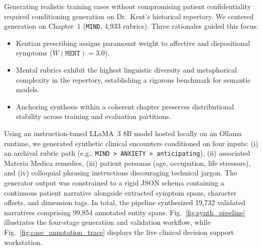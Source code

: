 Generating realistic training cases without compromising patient confidentiality required conditioning generation on Dr.~Kent's historical repertory. We centered generation on Chapter~1 (\texttt{MIND}, 4,933 rubrics). Three rationales guided this focus:
\begin{itemize}
    \item Kentian prescribing assigns paramount weight to affective and dispositional symptoms ($W(\texttt{MENT}) = 3.0$).
    \item Mental rubrics exhibit the highest linguistic diversity and metaphorical complexity in the repertory, establishing a rigorous benchmark for semantic models.
    \item Anchoring synthesis within a coherent chapter preserves distributional stability across training and evaluation partitions.
\end{itemize}

Using an instruction-tuned LLaMA~3 8B model hosted locally on an Ollama runtime, we generated synthetic clinical encounters conditioned on four inputs: (i) an archival rubric path (e.g., \texttt{MIND > ANXIETY > anticipating}), (ii) associated Materia Medica remedies, (iii) patient personas (age, occupation, life stressors), and (iv) colloquial phrasing instructions discouraging technical jargon. The generator output was constrained to a rigid JSON schema containing a continuous patient narrative alongside extracted symptom spans, character offsets, and dimension tags. In total, the pipeline synthesized 19,732 validated narratives comprising 99,854 annotated entity spans. Fig.~\ref{fig:synth_pipeline} illustrates the four-stage generation and validation workflow, while Fig.~\ref{fig:case_annotation_trace} displays the live clinical decision support workstation.


